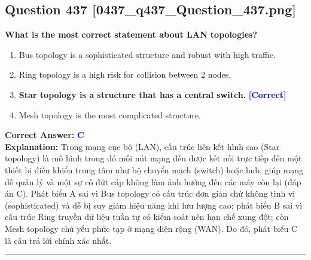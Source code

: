 \documentclass[11pt,a4paper]{article}
\begin{document}
\begin{minipage}{\textwidth}
\subsection*{Question 437 \quad \footnotesize{[0437\_q437\_Question\_437.png]}}
\noindent \textbf{What is the most correct statement about LAN topologies?}

\begin{enumerate}[label=\Alph*.]
    \item Bus topology is a sophisticated structure and robust with high traffic.
    \item Ring topology is a high risk for collision between 2 nodes.
    \item \textbf{Star topology is a structure that has a central switch.} \hfill \textcolor{blue}{\textbf{[Correct]}}
    \item Mesh topology is the most complicated structure.
\end{enumerate}

\noindent \textbf{Correct Answer:} \textcolor{blue}{\textbf{C}} \\[2pt]
\noindent \textbf{Explanation:} Trong mạng cục bộ (LAN), cấu trúc liên kết hình sao (Star topology) là mô hình trong đó mỗi nút mạng đều được kết nối trực tiếp đến một thiết bị điều khiển trung tâm như bộ chuyển mạch (switch) hoặc hub, giúp mạng dễ quản lý và một sự cố đứt cáp không làm ảnh hưởng đến các máy còn lại (đáp án C). Phát biểu A sai vì Bus topology có cấu trúc đơn giản chứ không tinh vi (sophisticated) và dễ bị suy giảm hiệu năng khi lưu lượng cao; phát biểu B sai vì cấu trúc Ring truyền dữ liệu tuần tự có kiểm soát nên hạn chế xung đột; còn Mesh topology chủ yếu phức tạp ở mạng diện rộng (WAN). Do đó, phát biểu C là câu trả lời chính xác nhất.

\par\vspace{0.3cm}
\hrule
\vspace{0.3cm}
\end{minipage}
\end{document}
